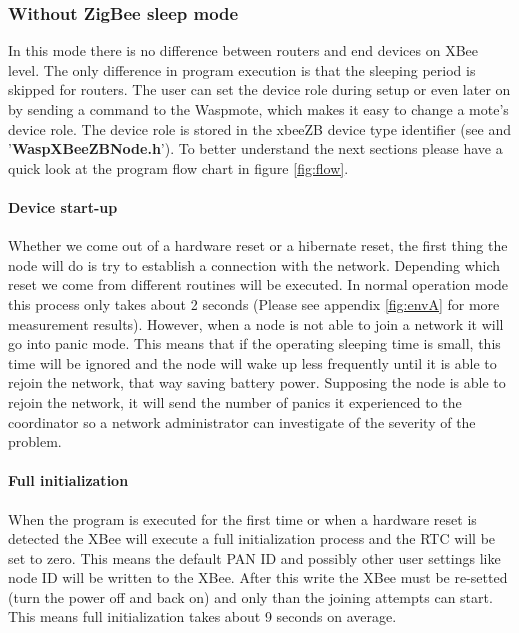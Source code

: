 \subsubsection{Without ZigBee sleep mode}
In this mode there is no difference between routers and end devices on XBee level. The only difference in program execution is that the sleeping period is skipped for routers. The user can set the device role during setup or even later on by sending a command to the Waspmote, which makes it easy to change a mote's device role. The device role is stored in the xbeeZB device type identifier (see  and '\textbf{WaspXBeeZBNode.h}').
To better understand the next sections please have a quick look at the program flow chart in figure \ref{fig:flow}.
\paragraph{Device start-up}
Whether we come out of a hardware reset or a hibernate reset, the first thing the node will do is try to establish a connection with the network. Depending which reset we come from different routines will be executed. In normal operation mode this process only takes about 2 seconds (Please see appendix \ref{fig:envA} for more measurement results). However, when a node is not able to join a network it will go into panic mode. This means that if the operating sleeping time is small, this time will be ignored and the node will wake up less frequently until it is able to rejoin the network, that way saving battery power. Supposing the node is able to rejoin the network, it will send the number of panics it experienced to the coordinator so a network administrator can investigate of the severity of the problem.

\paragraph{Full initialization}
When the program is executed for the first time or when a hardware reset is detected the XBee will execute a full initialization process and the RTC will be set to zero. This means the default PAN ID and possibly other user settings like node ID will be written to the XBee. After this write the XBee must be re-setted (turn the power off and back on) and only than the joining attempts can start. This means full initialization takes about 9 seconds on average. 

